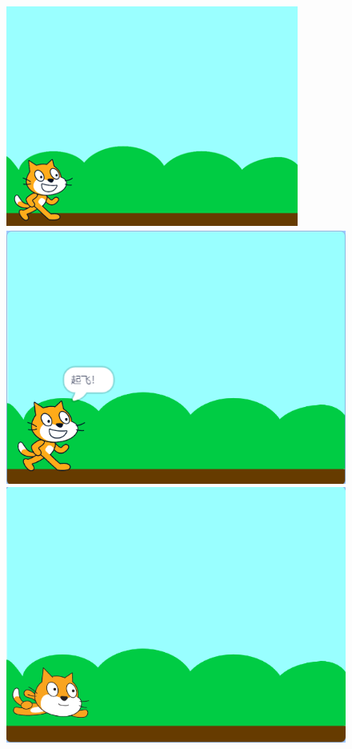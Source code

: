 \documentclass[10pt, a4paper]{article}
\begin{document}
\begin{enumerate}
        \begin{figure}[htb]
            \centering
            \begin{minipage}[t]{.19\textwidth}
                \centering
                \includegraphics[width=.9\textwidth]{37-2.png}
            \end{minipage}
            \begin{minipage}[t]{.19\textwidth}
                \centering
                \includegraphics[width=.9\textwidth]{37-3.png}
            \end{minipage}
            \begin{minipage}[t]{.19\textwidth}
                \centering
                \includegraphics[width=.9\textwidth]{37-4.png}

\end{minipage}
\end{figure}
\end{enumerate}
\end{document}
